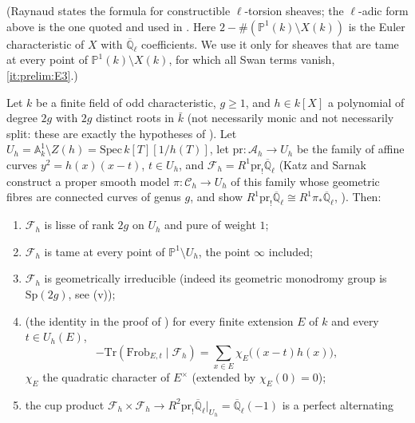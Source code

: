 \noindent (Raynaud states the formula for constructible $\ell$-torsion
sheaves; the $\ell$-adic form above is the one quoted and used in
\cite[proof of Lemma~10.1.12]{KatzSarnak}. Here
$2-\#(\mathbb P^1(k)\setminus X(k))$ is the Euler characteristic of $X$ with
$\overline{\mathbb Q}_\ell$ coefficients. We use it only for sheaves that are
tame at every point of $\mathbb P^1(k)\setminus X(k)$, for which all Swan
terms vanish, \ref{it:prelim:E3}.)

\begin{theorem}[Katz--Sarnak: the family $y^2=h(x)(x-t)$ and its monodromy {\cite[\S10.1]{KatzSarnak}}]\label{thm:prelim:ks}
Let $k$ be a finite field of odd characteristic, $g\ge1$, and $h\in k[X]$ a
polynomial of degree $2g$ with $2g$ distinct roots in $\bar k$ (not
necessarily monic and not necessarily split: these are exactly the
hypotheses of \cite[10.1.1]{KatzSarnak}). Let
$U_h=\mathbb A^1_k\setminus Z(h)=\mathrm{Spec}\,k[T][1/h(T)]$, let
$\mathrm{pr}:\mathcal A_h\to U_h$ be the family of affine curves
$y^2=h(x)(x-t)$, $t\in U_h$, and
$\mathcal F_h=R^1\mathrm{pr}_!\overline{\mathbb Q}_\ell$ (Katz and Sarnak
construct a proper smooth model $\pi:\mathcal C_h\to U_h$ of this family whose
geometric fibres are connected curves of genus $g$, and show
$R^1\mathrm{pr}_!\overline{\mathbb Q}_\ell\cong
R^1\pi_*\overline{\mathbb Q}_\ell$, \cite[10.1.3--10.1.11]{KatzSarnak}).
Then:
\begin{enumerate}[label=\textup{(\roman*)}]
\item \cite[Lemma~10.1.9]{KatzSarnak} $\mathcal F_h$ is lisse of rank $2g$ on
  $U_h$ and pure of weight $1$;
\item \cite[Lemma~10.1.12]{KatzSarnak} $\mathcal F_h$ is tame at every point
  of $\mathbb P^1\setminus U_h$, the point $\infty$ included;
\item \cite[Lemma~10.1.15]{KatzSarnak} $\mathcal F_h$ is geometrically
  irreducible (indeed its geometric monodromy group is $\mathrm{Sp}(2g)$, see
  \textup{(v)});
\item (the identity in the proof of \cite[Lemma~10.1.15]{KatzSarnak}) for
  every finite extension $E$ of $k$ and every $t\in U_h(E)$,
  \[
    -\mathrm{Tr}(\mathrm{Frob}_{E,t}\mid\mathcal F_h)
    =\sum_{x\in E}\chi_E\big((x-t)h(x)\big),
  \]
  $\chi_E$ the quadratic character of $E^\times$ (extended by
  $\chi_E(0)=0$);
\item \cite[Lemma~10.1.9 and Theorem~10.1.16]{KatzSarnak} the cup product
  $\mathcal F_h\times\mathcal F_h\to R^2\mathrm{pr}_!\overline{\mathbb
  Q}_\ell|_{U_h}=\overline{\mathbb Q}_\ell(-1)$ is a perfect alternating

\end{enumerate}
\end{theorem}
